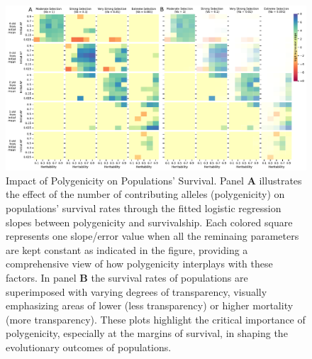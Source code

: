 \documentclass{article}
\begin{document}
\begin{figure}[b]
    \centering
    \includegraphics[width=1\textwidth]{figures/poly_panel_figure_2plots.pdf}
    \caption{Impact of Polygenicity on Populations' Survival. Panel \textbf{A} illustrates the effect of the number of contributing alleles (polygenicity) on populations' survival rates through the fitted logistic regression slopes between polygenicity and survivalship. Each colored square represents one slope/error value when all the reminaing parameters are kept constant as indicated in the figure, providing a comprehensive view of how polygenicity interplays with these factors. In panel \textbf{B} the survival rates of populations are superimposed with varying degrees of transparency, visually emphasizing areas of lower (less transparency) or higher mortality (more transparency). These plots highlight the critical importance of polygenicity, especially at the margins of survival, in shaping the evolutionary outcomes of populations.}
    \label{fig:poly_panel_figure}
\end{figure}
\end{document}
